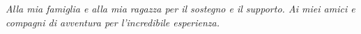 \clearpage
{}
\begin{center}
  \begin{flushright}
    \begin{minipage}{.5\textwidth}
      \textit{Alla mia famiglia e alla mia ragazza per il sostegno e il supporto.
      Ai miei amici e compagni di avventura per l'incredibile esperienza.}
    \end{minipage}
  \end{flushright}
\end{center}
\clearpage
